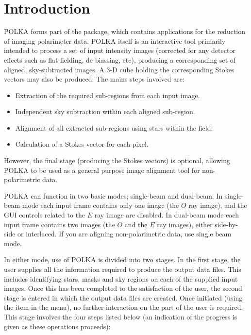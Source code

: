 \documentclass[11pt,nolof]{starlink}
\providecommand{\mylabel}[1] {\xlabel{#1}\label{#1}}
\begin{document}
\scfrontmatter

\section {\mylabel{POLKA_OVERVIEW}Introduction}
POLKA forms part of the  package, which contains
applications for the reduction of imaging polarimeter data. POLKA itself
is an interactive tool primarily intended to process a set of input
intensity images (corrected for any detector effects such as
flat-fielding, de-biassing, etc), producing a corresponding set of
aligned, sky-subtracted images. A 3-D cube holding the corresponding
Stokes vectors may also be produced. The mains steps involved are:

\begin{itemize}
\item Extraction of the required sub-regions from each input image.
\item Independent sky subtraction within each aligned sub-region.
\item Alignment of all extracted sub-regions using stars within the field.
\item Calculation of a Stokes vector for each pixel.
\end{itemize}

However, the final stage (producing the Stokes vectors) is optional,
allowing POLKA to be used as a general purpose image alignment tool for
non-polarimetric data.

POLKA can function in two basic modes; single-beam and dual-beam. In
single-beam mode each input frame contains only one image (the $O$ ray
image), and the GUI controls related to the $E$ ray image are
disabled. In dual-beam mode each input frame contains two images (the $O$
and the $E$ ray images), either side-by-side or interlaced. If you are
aligning non-polarimetric data, use single beam mode.

In either mode, use of POLKA is divided into two stages. In the first
stage, the user supplies all the information required to produce the
output data files. This includes identifying stars, masks and sky regions
on each of the supplied input images. Once this has been completed to the
satisfaction of the user, the second stage is entered in which the output
data files are created. Once initiated (using the  item in the 
menu), no further interaction on the part of the user is required. This
stage involves the four steps listed below (an indication of the progress
is given as these operations proceeds):
\end{document}
